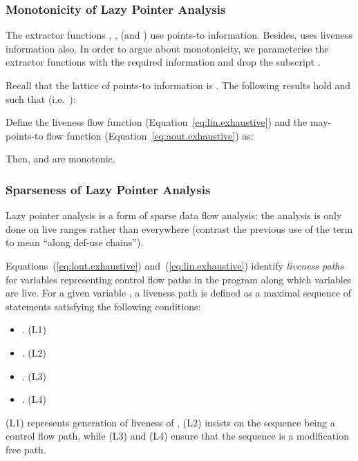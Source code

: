 \documentclass{llncs}
\newcommand{\must}{\text{\sf\em Must\/}\xspace}
\begin{document}
\subsubsection{Monotonicity of Lazy Pointer Analysis}
\label{sec:monotonicity}
The extractor functions , ,  (and \must)
use points-to
information. Besides,  uses liveness information also. In order
to argue about monotonicity, we parameterise the extractor functions
with the required information and drop the subscript .


Recall that the lattice of points-to information is \text{}.
The following
results hold \text{} and \text{} such that \text{} (i.e.\ ):




\begin{theorem}
Define the liveness flow function \text{} (Equation~\ref{eq:lin.exhaustive}) and the may-points-to
flow function \text{}
(Equation~\ref{eq:aout.exhaustive}) as:

Then,  and  are monotonic.
\end{theorem}




\subsubsection{Sparseness of Lazy Pointer Analysis}
\label{sec:sparseness}

Lazy pointer analysis is a form of sparse data flow analysis: the
analysis is only done on live ranges rather than everywhere (contrast
the previous use of the term to mean ``along def-use chains'').


Equations~(\ref{eq:lout.exhaustive}) and~(\ref{eq:lin.exhaustive})
identify {\em liveness paths\/} for variables representing control
flow paths in the program along which variables are live. For a given
variable , a liveness path is defined as a maximal sequence of
statements \text{} satisfying the following
conditions:
\begin{itemize}
\item  \text{}.
\hfill	(L1)
\item  \text{}.
\hfill	(L2) 
\item  . 
\hfill	(L3) 
\item  .
\hfill	(L4) 
\end{itemize}
(L1) represents generation of liveness of , (L2) insists on
the sequence being a control flow path, while (L3) and (L4)
ensure that the sequence is a modification free path. 
\end{document}
